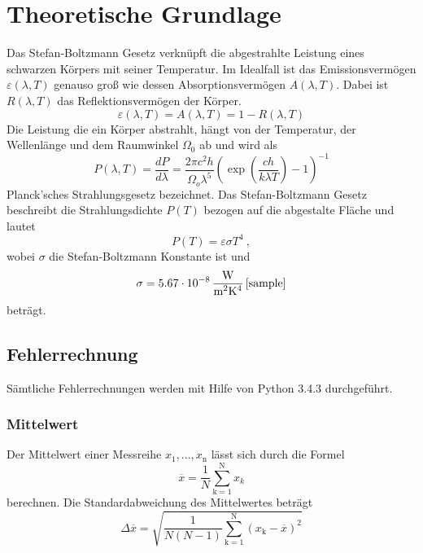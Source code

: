 \section{Theoretische Grundlage}
\label{sec:Theorie}
Das Stefan-Boltzmann Gesetz verknüpft die abgestrahlte Leistung eines schwarzen Körpers mit seiner Temperatur. Im Idealfall ist das Emissionsvermögen $\varepsilon(\lambda, T)$ genauso groß wie dessen Absorptionsvermögen $A(\lambda, T)$. Dabei ist $R(\lambda,T)$ das Reflektionsvermögen der Körper.
\begin{equation}
  \varepsilon(\lambda, T) = A(\lambda, T) = 1-R(\lambda, T)
  \label{eqn:emission}
\end{equation}
Die Leistung die ein Körper abstrahlt, hängt von der Temperatur, der Wellenlänge und dem Raumwinkel $\Omega_0$ ab und wird als
\begin{equation}
  P(\lambda, T) = \frac{dP}{d \lambda} = \frac{2 \pi c^2 h}{\Omega_o \lambda^5}\left( \exp \left( \frac{c h}{k \lambda T} \right) -1 \right)^{-1}
  \label{eqn:planck}
\end{equation}
Planck'sches Strahlungsgesetz bezeichnet.
Das Stefan-Boltzmann Gesetz beschreibt die Strahlungsdichte $P(T)$ bezogen auf die abgestalte Fläche und lautet
\begin{equation}
  P(T) = \varepsilon \sigma T^4 \ ,
  \label{eqn:strahlungsgesetz}
\end{equation}
wobei $\sigma$ die Stefan-Boltzmann Konstante ist und
\begin{equation}
  \sigma = 5.67 \cdot 10^{-8} \, \frac{\text{W}}{\text{m$^2$K$^4$}} \, \text{\cite{sample}}
\end{equation}
beträgt.
\subsection{Fehlerrechnung}
Sämtliche Fehlerrechnungen werden mit Hilfe von Python 3.4.3 durchgeführt.
\subsubsection{Mittelwert}
Der Mittelwert einer Messreihe $x_\text{1}, ... ,x_\text{n}$ lässt sich durch die Formel
\begin{equation}
	\overline{x} = \frac{1}{N} \sum_{\text{k}=1}^\text{N} x_k
	\label{eqn:ave}
\end{equation}
berechnen. Die Standardabweichung des Mittelwertes beträgt
\begin{equation}
	\Delta \overline{x} = \sqrt{ \frac{1}{N(N-1)} \sum_{\text{k}=1}^\text{N} (x_\text{k} - \overline{x})^2}
	\label{eqn:std}
\end{equation}
